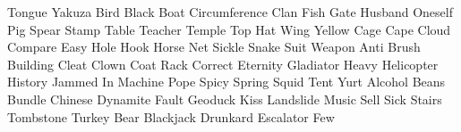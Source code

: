\documentclass[letterpaper,frontgrid]{flacards}
\begin{document}
        {Tongue}
        {Yakuza}
        {Bird}
        {Black}
        {Boat}
        {Circumference}
        {Clan}
        {Fish}
        {Gate}
        {Husband}
        {Oneself}
        {Pig}
        {Spear}
        {Stamp}
        {Table}
        {Teacher}
        {Temple}
        {Top Hat}
        {Wing}
        {Yellow}
        {Cage}
        {Cape}
        {Cloud}
        {Compare}
        {Easy}
        {Hole}
        {Hook}
        {Horse}
        {Net}
        {Sickle}
        {Snake}
        {Suit}
        {Weapon}
        {Anti}
        {Brush}
        {Building}
        {Cleat}
        {Clown}
        {Coat Rack}
        {Correct}
        {Eternity}
        {Gladiator}
        {Heavy}
        {Helicopter}
        {History}
        {Jammed In}
        {Machine}
        {Pope}
        {Spicy}
        {Spring}
        {Squid}
        {Tent}
        {Yurt}
        {Alcohol}
        {Beans}
        {Bundle}
        {Chinese}
        {Dynamite}
        {Fault}
        {Geoduck}
        {Kiss}
        {Landslide}
        {Music}
        {Sell}
        {Sick}
        {Stairs}
        {Tombstone}
        {Turkey}
        {Bear}
        {Blackjack}
        {Drunkard}
        {Escalator}
        {Few}
\end{document}
